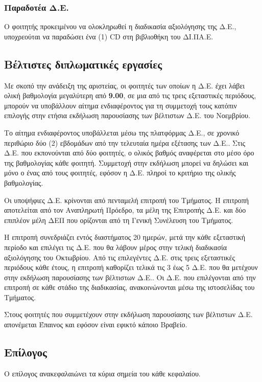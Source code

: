 \documentclass[twoside, a4paper, 11pt]{article}
\begin{document}
\subsubsection{Παραδοτέα Δ.Ε. }
Ο φοιτητής προκειμένου να ολοκληρωθεί η διαδικασία αξιολόγησης της Δ.Ε., υποχρεούται να παραδώσει ένα (1) CD στη βιβλιοθήκη του ΔΙ.ΠΑ.Ε.

\subsection{Βέλτιστες διπλωματικές εργασίες }
Με σκοπό την ανάδειξη της αριστείας, οι φοιτητές των οποίων η Δ.Ε. έχει λάβει ολική βαθμολογία μεγαλύτερη από \textbf{9.00}, σε μια από τις τρεις εξεταστικές περιόδους, μπορούν να υποβάλλουν αίτημα ενδιαφέροντος για τη συμμετοχή τους κατόπιν επιλογής στην ετήσια εκδήλωση παρουσίασης των βέλτιστων Δ.Ε. του Νοεμβρίου.

Το αίτημα ενδιαφέροντος υποβάλλεται μέσω της πλατφόρμας Δ.Ε., σε χρονικό περιθώριο δύο (2) εβδομάδων από την τελευταία ημέρα εξέτασης των Δ.Ε.. Στις Δ.Ε. που εκπονούνται από δύο φοιτητές, ο ολικός βαθμός αναφέρεται στο μέσο όρο της βαθμολογίας κάθε φοιτητή. Συμμετοχή στην εκδήλωση μπορεί να δηλώσει και μόνο ο ένας από τους φοιτητές, εφόσον η Δ.Ε. πληροί το κριτήριο της ολικής βαθμολογίας. 

Οι υποψήφιες Δ.Ε. κρίνονται από πενταμελή επιτροπή του Τμήματος. Η επιτροπή αποτελείται από τον Αναπληρωτή Πρόεδρο, τα μέλη της Επιτροπής Δ.Ε. και δύο επιπλέον μέλη ΔΕΠ που ορίζονται από τη Γενική Συνέλευση του Τμήματος. 

Η επιτροπή συνεδριάζει εντός διαστήματος 20 ημερών, μετά την κάθε εξεταστική περίοδο και επιλέγει τις Δ.Ε. που θα λάβουν μέρος στην τελική διαδικασία αξιολόγησης του Οκτωβρίου. Από τις επιλεγέντες Δ.Ε. στις τρεις εξεταστικές περιόδους κάθε έτους, η επιτροπή καθορίζει τελικά τις 3 έως 5 Δ.Ε. που θα μετέχουν στην εκδήλωση παρουσίασης των βέλτιστων Δ.Ε.. Οι Δ.Ε. που επιλέγονται από την επιτροπή σε κάθε στάδιο της διαδικασίας, ανακοινώνονται μέσω της ιστοσελίδας του Τμήματος. 

Στους φοιτητές που συμμετέχουν στην εκδήλωση παρουσίασης των βέλτιστων Δ.Ε. απονέμεται Έπαινος και εφόσον είναι εφικτό κάποιο Βραβείο.

\subsection{Επίλογος}
Ο επίλογος ανακεφαλαιώνει τα κύρια σημεία του κάθε κεφαλαίου.
\end{document}
